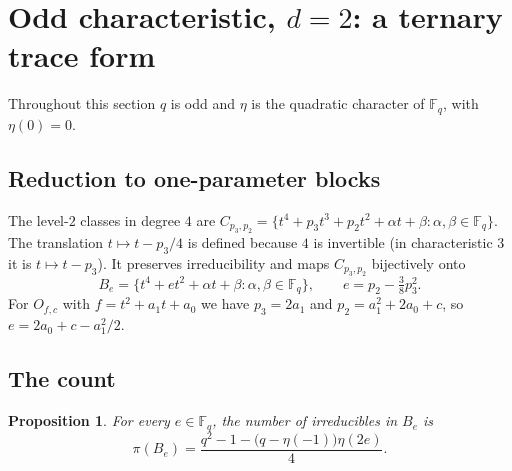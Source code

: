 \documentclass[11pt,a4paper]{amsart}
\newtheorem{proposition}[theorem]{Proposition}
\theoremstyle{definition}
\theoremstyle{remark}
\newcommand{\F}{\mathbb{F}}
\begin{document}
\section{\texorpdfstring{Odd characteristic, $d=2$: a ternary trace form}{Odd characteristic, d=2: a ternary trace form}}\label{sec:odd2}

Throughout this section $q$ is odd and $\eta$ is the quadratic character of $\F_q$, with $\eta(0)=0$.

\subsection{Reduction to one-parameter blocks}
The level-$2$ classes in degree $4$ are $C_{p_3,p_2}=\{t^4+p_3t^3+p_2t^2+\alpha t+\beta:\alpha,\beta\in\F_q\}$. The
translation $t\mapsto t-p_3/4$ is defined because $4$ is invertible (in characteristic $3$ it is $t\mapsto t-p_3$).
It preserves irreducibility and maps $C_{p_3,p_2}$ bijectively onto
\[
B_e=\{t^4+et^2+\alpha t+\beta:\alpha,\beta\in\F_q\},\qquad e=p_2-\tfrac38p_3^2 .
\]
For $O_{f,c}$ with $f=t^2+a_1t+a_0$ we have $p_3=2a_1$ and $p_2=a_1^2+2a_0+c$, so $e=2a_0+c-a_1^2/2$.

\subsection{The count}
\begin{proposition}\label{prop:odd2}
For every $e\in\F_q$, the number of irreducibles in $B_e$ is
\[
\pi(B_e)=\frac{q^2-1-\bigl(q-\eta(-1)\bigr)\eta(2e)}{4}.
\]
\end{proposition}
\end{document}
